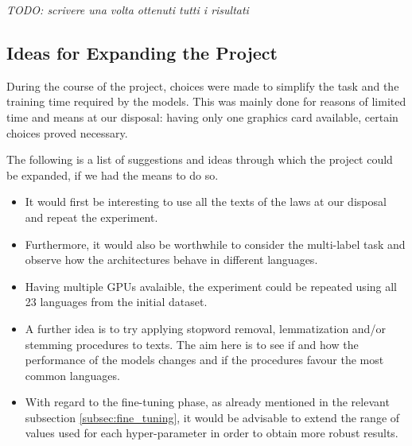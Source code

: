 \documentclass[letterpaper,11pt]{article}
\begin{document}
\textit{TODO: scrivere una volta ottenuti tutti i risultati}

\subsection{Ideas for Expanding the Project}

During the course of the project, choices were made to simplify the task and the training time required by the models. This was mainly done for reasons of limited time and means at our disposal: having only one graphics card available, certain choices proved necessary.

The following is a list of suggestions and ideas through which the project could be expanded, if we had the means to do so.

\begin{itemize}
  \item It would first be interesting to use all the texts of the laws at our disposal and repeat the experiment.
  \item Furthermore, it would also be worthwhile to consider the multi-label task and observe how the architectures behave in different languages.
  \item Having multiple GPUs avalaible, the experiment could be repeated using all 23 languages from the initial dataset.
  \item A further idea is to try applying stopword removal, lemmatization and/or stemming procedures to texts. The aim here is to see if and how the performance of the models changes and if the procedures favour the most common languages.
  \item With regard to the fine-tuning phase, as already mentioned in the relevant subsection \ref{subsec:fine_tuning}, it would be advisable to extend the range of values used for each hyper-parameter in order to obtain more robust results. 
\end{itemize}



\newpage



\end{document}
